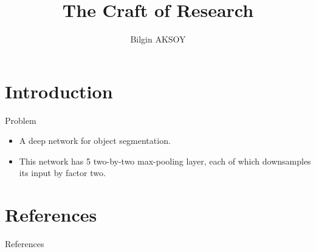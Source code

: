 \documentclass{beamer}
\title[The Craft of Research]{The Craft of Research}
\author{Bilgin AKSOY}
\begin{document}
	\begin{frame}
	  \titlepage
	\end{frame}

\section{Introduction}

	\begin{frame}{Problem}
		
		\begin{itemize}
		  \item A deep network for object segmentation.  
		  \item \justifying This network has 5 two-by-two max-pooling layer, each of which downsamples its input by factor two. 
		\end{itemize}
		
	\end{frame}
	

	
\section{References}
	\begin{block}{References}
	\end{block}
	
	
\end{document}
